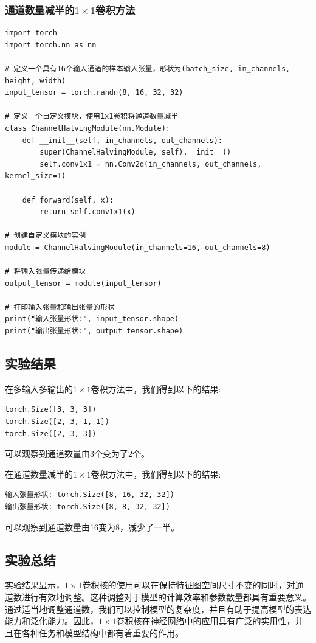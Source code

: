 \documentclass[a4paper,12pt]{article}
\begin{document}
\subsubsection{通道数量减半的$1 \times 1$卷积方法}
\begin{lstlisting}
import torch
import torch.nn as nn

# 定义一个具有16个输入通道的样本输入张量，形状为(batch_size, in_channels, height, width)
input_tensor = torch.randn(8, 16, 32, 32)

# 定义一个自定义模块，使用1x1卷积将通道数量减半
class ChannelHalvingModule(nn.Module):
    def __init__(self, in_channels, out_channels):
        super(ChannelHalvingModule, self).__init__()
        self.conv1x1 = nn.Conv2d(in_channels, out_channels, kernel_size=1)

    def forward(self, x):
        return self.conv1x1(x)

# 创建自定义模块的实例
module = ChannelHalvingModule(in_channels=16, out_channels=8)

# 将输入张量传递给模块
output_tensor = module(input_tensor)

# 打印输入张量和输出张量的形状
print("输入张量形状:", input_tensor.shape)
print("输出张量形状:", output_tensor.shape)
\end{lstlisting}

\subsection{实验结果}
在多输入多输出的$1 \times 1$卷积方法中，我们得到以下的结果:
\begin{lstlisting}
torch.Size([3, 3, 3])
torch.Size([2, 3, 1, 1])
torch.Size([2, 3, 3])
\end{lstlisting}
可以观察到通道数量由3个变为了2个。

在通道数量减半的$1 \times 1$卷积方法中，我们得到以下的结果:
\begin{lstlisting}
输入张量形状: torch.Size([8, 16, 32, 32])
输出张量形状: torch.Size([8, 8, 32, 32])
\end{lstlisting}
可以观察到通道数量由16变为8，减少了一半。

\subsection{实验总结}
实验结果显示，$1 \times 1$卷积核的使用可以在保持特征图空间尺寸不变的同时，对通道数进行有效地调整。这种调整对于模型的计算效率和参数数量都具有重要意义。通过适当地调整通道数，我们可以控制模型的复杂度，并且有助于提高模型的表达能力和泛化能力。因此，$1 \times 1$卷积核在神经网络中的应用具有广泛的实用性，并且在各种任务和模型结构中都有着重要的作用。
\end{document}
